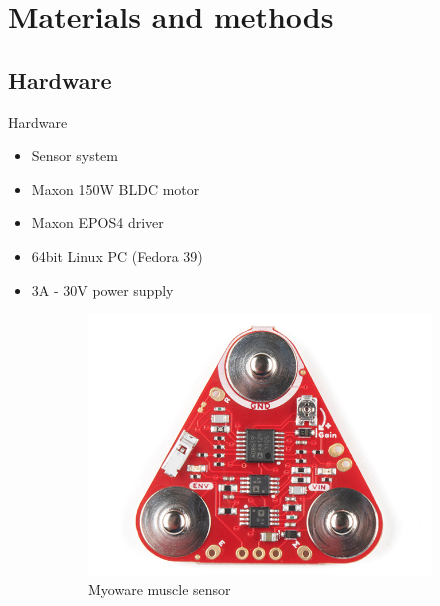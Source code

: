 \documentclass[aspectratio=169]{beamer}
\begin{document}
\section{Materials and methods}
\subsection{Hardware}
\begin{frame}{Hardware}
\begin{itemize}
  \item Sensor system 
  \item Maxon 150W BLDC motor
  \item Maxon EPOS4 driver
  \item 64bit Linux PC (Fedora 39)
  \item 3A - 30V power supply
\end{itemize}
\begin{figure}
    \centering
    \begin{subfigure}{0.2\textwidth}
        \centering
        \includegraphics[width=\linewidth]{myoware_sensor.jpg}
        \caption{Myoware muscle sensor}
        \label{fig:myoware_sensor}
    \end{subfigure}
    \begin{subfigure}{0.14\textwidth}
        \centering

\end{subfigure}
\end{figure}
\end{frame}
\end{document}
